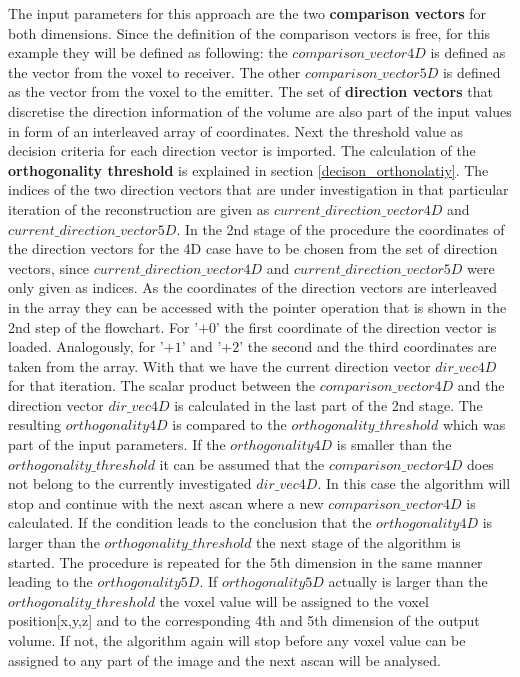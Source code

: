 The input parameters for this approach are the two \textbf{comparison vectors} for both dimensions. Since the definition of the comparison vectors is free, for this example they will be defined as following: the $comparison\_vector4D$ is defined as the vector from the voxel to receiver. The other $comparison\_vector5D$ is defined as the vector from the voxel to the emitter.
The set of \textbf{direction vectors} that discretise the direction information of the volume are also part of the input values in form of an interleaved array of coordinates. Next the threshold value as decision criteria for each direction vector is imported. The calculation of the \textbf{orthogonality threshold} is explained in section \ref{decison_orthonolatiy}. The indices of the two direction vectors that are under investigation in that particular iteration of the reconstruction are given as $current\_direction\_vector4D$ and $current\_direction\_vector5D$. 
In the 2nd stage of the procedure the coordinates of the direction vectors for the 4D case have to be chosen from the set of direction vectors, since $current\_direction\_vector4D$ and $current\_direction\_vector5D$ were only given as indices. As the coordinates of the direction vectors are interleaved in the array they can be accessed with the pointer operation that is shown in the 2nd step of the flowchart. For '$+0$' the first coordinate of the direction vector is loaded. Analogously, for '$+1$' and '$+2$' the second and the third coordinates are taken from the array.
With that we have the current direction vector $dir\_vec4D$ for that iteration.
The scalar product between the $comparison\_vector4D$ and the direction vector $dir\_vec4D$ is calculated in the last part of the 2nd stage. The resulting $orthogonality4D$ is compared to the $orthogonality\_threshold$ which was part of the input parameters. If the $orthogonality4D$ is smaller than the $orthogonality\_threshold$ it can be assumed that the $comparison\_vector4D$ does not belong to the currently investigated $dir\_vec4D$. In this case the algorithm will stop and continue with the next \ac{ascan} where a new $comparison\_vector4D$ is calculated. 
If the condition leads to the conclusion that the $orthogonality4D$ is larger than the $orthogonality\_threshold$ the next stage of the algorithm is started.
The procedure is repeated for the 5th dimension in the same manner leading to the $orthogonality5D$. If $orthogonality5D$ actually is larger than the $orthogonality\_threshold$ the voxel value will be assigned to the voxel position[x,y,z] and to the corresponding 4th and 5th dimension of the output volume. If not, the algorithm again will stop before any voxel value can be assigned to any part of the image and the next \ac{ascan} will be analysed.







